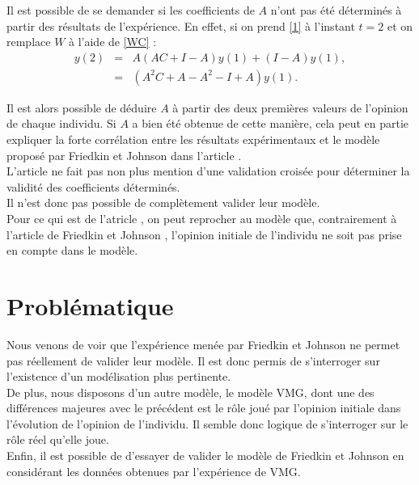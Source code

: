 \documentclass{scrreprt}
\begin{document}
Il est possible de se demander si les coefficients de $A$ n'ont pas été déterminés à partir des résultats de l'expérience. En effet, si on prend \eqref{1} à l’instant $t=2$ et on remplace $W$ à l’aide de \eqref{WC} :\\

\begin{align}
y(2) & = & A(AC+I-A)y(1)+(I-A)y(1), \\ 
& = & (A^{2}C+A-A^{2}-I+A)y(1).
\end{align}

Il est alors possible de déduire $A$ à partir des deux premières valeurs de l'opinion de chaque individu. Si $A$ a bien été obtenue de cette manière, cela peut en partie expliquer la forte corrélation entre les résultats expérimentaux et le modèle proposé par Friedkin et Johnson dans l'article \cite{FJ}.\\

L'article ne fait pas non plus mention d'une validation croisée pour déterminer la validité des coefficients déterminés.\\

Il n'est donc pas possible de complètement valider leur modèle.\\

Pour ce qui est de l'atricle \cite{VMG}, on peut reprocher au modèle que, contrairement à l'article de Friedkin et Johnson \cite{FJ}, l'opinion initiale de l'individu ne soit pas prise en compte dans le modèle.

\section{Problématique}

Nous venons de voir que l’expérience menée par Friedkin et Johnson ne permet pas réellement de valider leur modèle. Il est donc permis de s'interroger sur l'existence d'un modélisation plus pertinente.\\

De plus, nous disposons d’un autre modèle, le modèle VMG, dont une des différences majeures avec le précédent est le rôle joué par l’opinion initiale dans l'évolution de l'opinion de l'individu. Il semble donc logique de s’interroger sur le rôle réel qu’elle joue.\\

Enfin, il est possible de d’essayer de valider le modèle de Friedkin et Johnson en considérant les données obtenues par l’expérience de VMG.\\%
\end{document}
